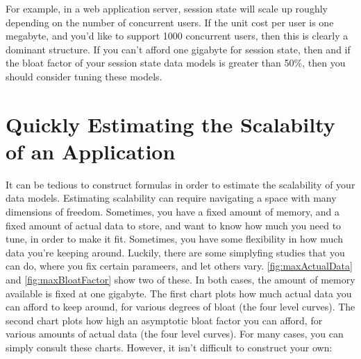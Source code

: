 For example, in a web application server, session state will scale up roughly
depending on the number of concurrent users. If the unit cost per user is one
megabyte, and you'd like to support 1000 concurrent users, then this is clearly
a dominant structure. If you can't afford one gigabyte for session state, then
and if the bloat factor of your session state data models is greater than 50\%,
then you should consider tuning these models.


\section{Quickly Estimating the Scalabilty of an Application}

It can be tedious to construct formulas in order to estimate the scalability of
your data models. Estimating scalability can require navigating a space with
many dimensions of freedom. Sometimes, you have a fixed amount of memory, and a
fixed amount of actual data to store, and want to know how much you need to
tune, in order to make it fit. Sometimes, you have some flexibility in how much
data you're keeping around. Luckily, there are some simplyfing studies that you
can do, where you fix certain parameers, and let others vary.
\autoref{fig:maxActualData} and \autoref{fig:maxBloatFactor} show two of these.
In both cases, the amount of memory available is fixed at one gigabyte. The
first chart plots how much actual data you can afford to keep around, for
various degrees of bloat (the four level curves). The second chart plots how
high an asymptotic bloat factor you can afford, for various amounts of actual
data (the four level curves). For many cases, you can simply consult these
charts. However, it isn't difficult to construct your own:


